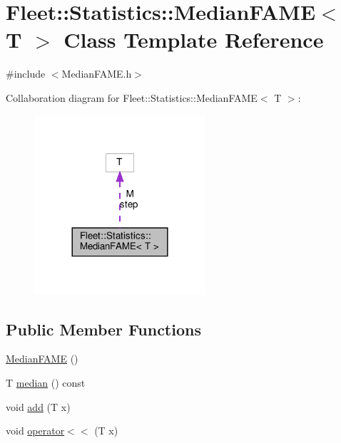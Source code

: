 \hypertarget{class_fleet_1_1_statistics_1_1_median_f_a_m_e}{}\section{Fleet\+:\+:Statistics\+:\+:Median\+F\+A\+ME$<$ T $>$ Class Template Reference}
\label{class_fleet_1_1_statistics_1_1_median_f_a_m_e}


{\ttfamily \#include $<$Median\+F\+A\+M\+E.\+h$>$}



Collaboration diagram for Fleet\+:\+:Statistics\+:\+:Median\+F\+A\+ME$<$ T $>$\+:
\nopagebreak
\begin{figure}[H]
\begin{center}
\leavevmode
\includegraphics[width=180pt]{class_fleet_1_1_statistics_1_1_median_f_a_m_e__coll__graph}
\end{center}
\end{figure}
\subsection*{Public Member Functions}
\begin{DoxyCompactItemize}
\item 
\hyperlink{class_fleet_1_1_statistics_1_1_median_f_a_m_e_a0be08191b9c7efbadc85e32cf650fe2c}{Median\+F\+A\+ME} ()
\item 
T \hyperlink{class_fleet_1_1_statistics_1_1_median_f_a_m_e_a9ebd0ea21583d80bd9ca2f3cd6f06941}{median} () const
\item 
void \hyperlink{class_fleet_1_1_statistics_1_1_median_f_a_m_e_a676e90f267fc315e67416ec432944896}{add} (T x)
\item 
void \hyperlink{class_fleet_1_1_statistics_1_1_median_f_a_m_e_a5a81f46d3917cd67d5060eb88f7e6cc3}{operator$<$$<$} (T x)
\end{DoxyCompactItemize}
